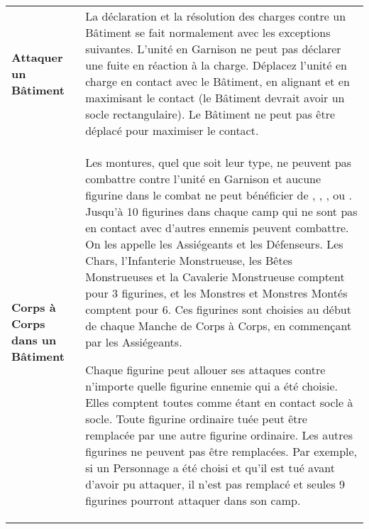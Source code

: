 \noindent\begin{tabular}{>{\bfseries\raggedleft}p{2.2cm}p{13.5cm}}
Attaquer un Bâtiment & La déclaration et la résolution des charges contre un Bâtiment se fait normalement avec les exceptions suivantes. L'unité en Garnison ne peut pas déclarer une fuite en réaction à la charge. Déplacez l'unité en charge en contact avec le Bâtiment, en alignant et en maximisant le contact (le Bâtiment devrait avoir un socle rectangulaire). Le Bâtiment ne peut pas être déplacé pour maximiser le contact. \tabularnewline
Corps à Corps dans un Bâtiment & Les montures, quel que soit leur type, ne peuvent pas combattre contre l'unité en Garnison et aucune figurine dans le combat ne peut bénéficier de \impacthits{}, \lance{}, \lightlance{}, \mountsprotection{} ou \barding{}. Jusqu'à 10 figurines dans chaque camp qui ne sont pas en contact avec d'autres ennemis peuvent combattre. On les appelle les Assiégeants et les Défenseurs. Les Chars, l'Infanterie Monstrueuse, les Bêtes Monstrueuses et la Cavalerie Monstrueuse comptent pour 3 figurines, et les Monstres et Monstres Montés comptent pour 6. Ces figurines sont choisies au début de chaque Manche de Corps à Corps, en commençant par les Assiégeants.

Chaque figurine peut allouer ses attaques contre n'importe quelle figurine ennemie qui a été choisie. Elles comptent toutes comme étant en contact socle à socle. Toute figurine ordinaire tuée peut être remplacée par une autre figurine ordinaire. Les autres figurines ne peuvent pas être remplacées. Par exemple, si un Personnage a été choisi et qu'il est tué avant d'avoir pu attaquer, il n'est pas remplacé et seules 9 figurines pourront attaquer dans son camp.


\end{tabular}

